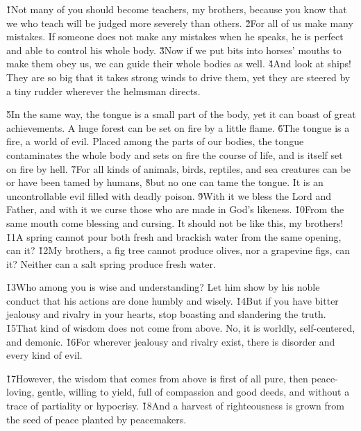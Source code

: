 \v{1}Not many of you should become teachers, my brothers, because you know that we who teach will be judged more severely than others. \v{2}For all of us make many mistakes. If someone does not make any mistakes when he speaks, he is perfect and able to control his whole body. \v{3}Now if we put bits into horses' mouths to make them obey us, we can guide their whole bodies as well. \v{4}And look at ships! They are so big that it takes strong winds to drive them, yet they are steered by a tiny rudder wherever the helmsman directs.

\v{5}In the same way, the tongue is a small part of the body, yet it can boast of great achievements. A huge forest can be set on fire by a little flame. \v{6}The tongue is a fire, a world of evil. Placed among the parts of our bodies, the tongue contaminates the whole body and sets on fire the course of life, and is itself set on fire by hell. \v{7}For all kinds of animals, birds, reptiles, and sea creatures can be or have been tamed by humans, \v{8}but no one can tame the tongue. It is an uncontrollable evil filled with deadly poison. \v{9}With it we bless the Lord and Father, and with it we curse those who are made in God's likeness. \v{10}From the same mouth come blessing and cursing. It should not be like this, my brothers! \v{11}A spring cannot pour both fresh and brackish water from the same opening, can it? \v{12}My brothers, a fig tree cannot produce olives, nor a grapevine figs, can it? Neither can a salt spring produce fresh water.

\v{13}Who among you is wise and understanding? Let him show by his noble conduct that his actions are done humbly and wisely. \v{14}But if you have bitter jealousy and rivalry in your hearts, stop boasting and slandering the truth. \v{15}That kind of wisdom does not come from above. No, it is worldly, self-centered, and demonic. \v{16}For wherever jealousy and rivalry exist, there is disorder and every kind of evil.

\v{17}However, the wisdom that comes from above is first of all pure, then peace-loving, gentle, willing to yield, full of compassion and good deeds, and without a trace of partiality or hypocrisy. \v{18}And a harvest of righteousness is grown from the seed of peace planted by peacemakers.

